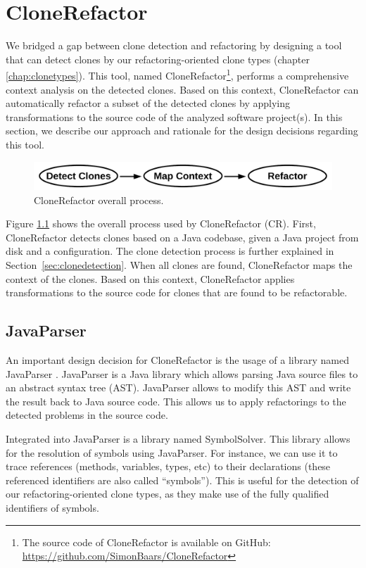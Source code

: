 \chapter{CloneRefactor} \label{ch:clonerefactor}
We bridged a gap between clone detection and refactoring by designing a tool that can detect clones by our refactoring-oriented clone types (chapter \ref{chap:clonetypes}). This tool, named CloneRefactor\footnote{The source code of CloneRefactor is available on GitHub: \url{https://github.com/SimonBaars/CloneRefactor}}, performs a comprehensive context analysis on the detected clones. Based on this context, CloneRefactor can automatically refactor a subset of the detected clones by applying transformations to the source code of the analyzed software project(s). In this section, we describe our approach and rationale for the design decisions regarding this tool.

\begin{figure}[H]
  \centering
  \includegraphics[width=0.8\columnwidth]{img/flow}
  \caption{CloneRefactor overall process.}
  \label{fig:clonerefactorprocess}
\end{figure}

Figure \ref{fig:clonerefactorprocess} shows the overall process used by CloneRefactor (CR). First, CloneRefactor detects clones based on a Java codebase, given a Java project from disk and a configuration. The clone detection process is further explained in Section~\ref{sec:clonedetection}. When all clones are found, CloneRefactor maps the context of the clones. Based on this context, CloneRefactor applies transformations to the source code for clones that are found to be refactorable.

\section{JavaParser}
An important design decision for CloneRefactor is the usage of a library named JavaParser \cite{tomassetti2017javaparser}. JavaParser is a Java library which allows parsing Java source files to an abstract syntax tree (AST). JavaParser allows to modify this AST and write the result back to Java source code. This allows us to apply refactorings to the detected problems in the source code.

Integrated into JavaParser is a library named SymbolSolver. This library allows for the resolution of symbols using JavaParser. For instance, we can use it to trace references (methods, variables, types, etc) to their declarations (these referenced identifiers are also called ``symbols''). This is useful for the detection of our refactoring-oriented clone types, as they make use of the fully qualified identifiers of symbols.


